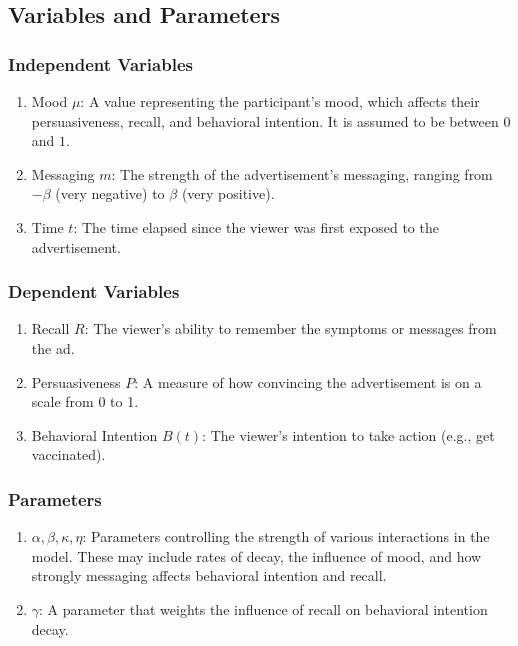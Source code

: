 \documentclass[12pt,a4paper]{article}
\begin{document}
\subsection{Variables and Parameters}
\subsubsection{Independent Variables}
\begin{enumerate}
    \item Mood \( \mu \): A value representing the participant's mood, which affects their persuasiveness, recall, and behavioral intention. It is assumed to be between \( 0 \) and \( 1 \).
    \item Messaging \( m \): The strength of the advertisement's messaging, ranging from \( -\beta \) (very negative) to \( \beta \) (very positive).
    \item Time \( t \): The time elapsed since the viewer was first exposed to the advertisement.
\end{enumerate}

\subsubsection{Dependent Variables}
\begin{enumerate}
    \item Recall \( R \): The viewer’s ability to remember the symptoms or messages from the ad.
    \item Persuasiveness \( P \): A measure of how convincing the advertisement is on a scale from 0 to 1.
    \item Behavioral Intention \( B(t) \): The viewer’s intention to take action (e.g., get vaccinated).
\end{enumerate}

\subsubsection{Parameters}
\begin{enumerate}
    \item \( \alpha, \beta, \kappa, \eta \): Parameters controlling the strength of various interactions in the model. These may include rates of decay, the influence of mood, and how strongly messaging affects behavioral intention and recall.
    \item \( \gamma \): A parameter that weights the influence of recall on behavioral intention decay.
\end{enumerate}
\end{document}
